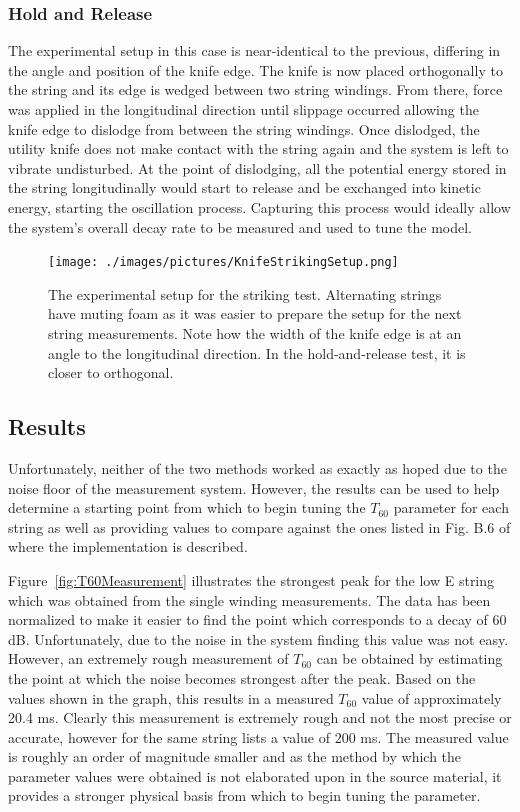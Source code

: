 \documentclass[../main.tex]{subfiles}
\begin{document}
\subsubsection{Hold and Release}
The experimental setup in this case is near-identical to the previous, differing in the angle and position of the knife edge. The knife is now placed orthogonally to the string and its edge is wedged between two string windings. From there, force was applied in the longitudinal direction until slippage occurred allowing the knife edge to dislodge from between the string windings. Once dislodged, the utility knife does not make contact with the string again and the system is left to vibrate undisturbed. At the point of dislodging, all the potential energy stored in the string longitudinally would start to release and be exchanged into kinetic energy, starting the oscillation process. Capturing this process would ideally allow the system's overall decay rate to be measured and used to tune the model.

\begin{figure}[h]
    \centering
    \texttt{[image: ./images/pictures/KnifeStrikingSetup.png]}
    \caption{The experimental setup for the striking test. Alternating strings have muting foam as it was easier to prepare the setup for the next string measurements. Note how the width of the knife edge is at an angle to the longitudinal direction. In the hold-and-release test, it is closer to orthogonal.}
    \label{fig:KnifeStrikingSetup}
\end{figure}

\subsection{Results}
\label{sec:T60Measurement}
Unfortunately, neither of the two methods worked as exactly as hoped due to the noise floor of the measurement system. However, the results can be used to help determine a starting point from which to begin tuning the $T_{60}$ parameter for each string as well as providing values to compare against the ones listed in Fig. B.6 of  where the implementation is described.

Figure~\ref{fig:T60Measurement} illustrates the strongest peak for the low E string which was obtained from the single winding measurements. The data has been normalized to make it easier to find the point which corresponds to a decay of 60 dB. Unfortunately, due to the noise in the system finding this value was not easy. However, an extremely rough measurement of $T_{60}$ can be obtained by estimating the point at which the noise becomes strongest after the peak. Based on the values shown in the graph, this results in a measured $T_{60}$ value of approximately 20.4 ms. Clearly this measurement is extremely rough and not the most precise or accurate, however for the same string  lists a value of 200 ms. The measured value is roughly an order of magnitude smaller and as the method by which the parameter values were obtained is not elaborated upon in the source material, it provides a stronger physical basis from which to begin tuning the parameter.
\end{document}
